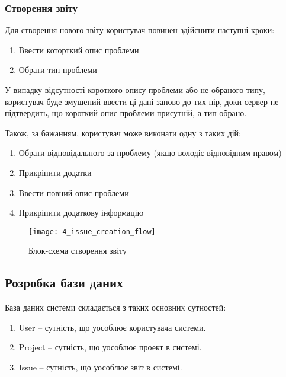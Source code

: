 \documentclass[../main.tex]{subfiles}
\begin{document}
\subsubsection{Створення звіту}
Для створення нового звіту користувач повинен здійснити наступні кроки:
\begin{enumerate}
	\item Ввести которткий опис проблеми
	\item Обрати тип проблеми
\end{enumerate}

У випадку відсутності короткого опису проблеми або не обраного типу, користувач буде змушений ввести ці дані заново до тих пір, доки сервер не підтвердить, що короткий опис проблеми присутній, а тип обрано.

Також, за бажанням, користувач може виконати одну з таких дій:
\begin{enumerate}
	\item Обрати відповідального за проблему (якщо володіє відповідним правом)
	\item Прикріпити додатки
	\item Ввести повний опис проблеми
	\item Прикріпити додаткову інформацію
\end{enumerate}

\begin{figure}[H]
	\centering
	\texttt{[image: 4\_issue\_creation\_flow]}
	\caption{Блок-схема створення звіту}
\end{figure}

\subsection{Розробка бази даних}

База даних системи складається з таких основних сутностей:
\begin{enumerate}
	\item User -- сутність, що уособлює користувача системи.
	\item Project -- сутність, що уособлює проект в системі.
	\item Issue -- сутність, що уособлює звіт в системі.
\end{enumerate}
\end{document}
